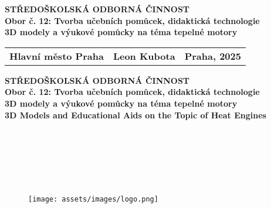 
\pagestyle{empty}
{\centering
\fontsize{18}{0}\textbf{STŘEDOŠKOLSKÁ ODBORNÁ ČINNOST}\\
\vspace{0.25cm}
\fontsize{14}{0}\textbf{Obor č. 12: Tvorba učebních pomůcek, didaktická technologie}\\
\vspace{8cm}
\fontsize{20}{0}\textbf{3D modely a výukové pomůcky na téma tepelné motory}\\
\vfill{}

\begin{tabularx}{1\textwidth} { 
    >{\raggedright\arraybackslash}X 
    >{\centering\arraybackslash}X 
    >{\raggedleft\arraybackslash}X}
    \fontsize{16}{0}\textbf{Hlavní město Praha} & 
    \fontsize{16}{0}\textbf{Leon Kubota} & 
    \fontsize{16}{0}\textbf{Praha, 2025}
\end{tabularx}}

\newpage
{\centering
\fontsize{18}{0}\textbf{STŘEDOŠKOLSKÁ ODBORNÁ ČINNOST}\\
\vspace{0.25cm}
\fontsize{14}{0}\textbf{Obor č. 12: Tvorba učebních pomůcek, didaktická technologie}\\
\vspace{7.5cm}
\fontsize{20}{0}\textbf{3D modely a výukové pomůcky na téma tepelné motory}\\
\vspace{1.5cm}
\fontsize{20}{0}\textbf{3D Models and Educational Aids on the Topic of Heat Engines}\\
\vspace{0.25cm}
\vfill{}
\begin{minipage}{0.8\textwidth}
      \begin{flushleft}
        \fontsize{16}{20}\\
        \fontsize{16}{20}\\
        \fontsize{16}{20}\\
        \fontsize{16}{20}\\
        \fontsize{12}{20}\selectfont{Praha, 2025}\\
    \end{flushleft}
\end{minipage}%
\begin{minipage}{0.2\textwidth}
    \begin{figure}[H]
        \texttt{[image: assets/images/logo.png]}
    \end{figure}
\end{minipage}
}

